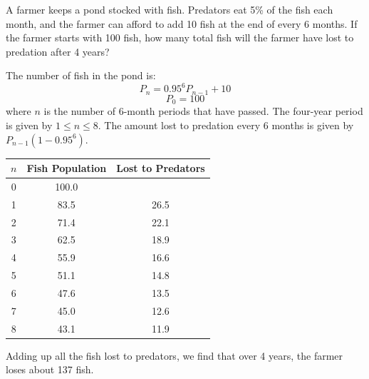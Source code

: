 \begin{Exercise}[label=seqcalc6]
    A farmer keeps a pond stocked with fish. Predators eat 5\% of the fish each month,
    and the farmer can afford to add 10 fish at the end of every 6 months. If the farmer starts with 100 fish, how many total fish
    will the farmer have lost to predation after 4 years?
\end{Exercise}

\begin{Answer}[ref=seqcalc6]
    The number of fish in the pond is:
    $$P_n = 0.95^6 P_{n-1} + 10$$
    $$P_0 = 100$$
    where $n$ is the number of 6-month periods that have passed. The four-year
    period is given by $1 \leq n \leq 8$. The amount lost to predation every 6
    months is given by $P_{n-1}(1-0.95^6)$.
    \begin{center}
        \begin{tabular}{|c|c|c|}\hline
            $n$ & Fish Population & Lost to Predators \\
            \hline
            0   & 100.0           &                   \\
            \hline
            1   & 83.5            & 26.5              \\
            \hline
            2   & 71.4            & 22.1              \\
            \hline
            3   & 62.5            & 18.9              \\
            \hline
            4   & 55.9            & 16.6              \\
            \hline
            5   & 51.1            & 14.8              \\
            \hline
            6   & 47.6            & 13.5              \\
            \hline
            7   & 45.0            & 12.6              \\
            \hline
            8   & 43.1            & 11.9              \\
            \hline
        \end{tabular}
    \end{center}
    Adding up all the fish lost to predators, we find that over 4 years, the farmer loses about 137 fish.
\end{Answer}







